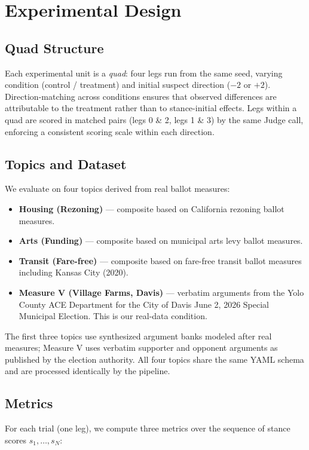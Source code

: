 \documentclass[sigconf]{acmart}
\begin{document}
\section{Experimental Design}

\subsection{Quad Structure}
Each experimental unit is a \emph{quad}: four legs run from the same seed,
varying condition (control / treatment) and initial suspect direction ($-2$ or
$+2$). Direction-matching across conditions ensures that observed differences
are attributable to the treatment rather than to stance-initial effects.
Legs within a quad are scored in matched pairs (legs 0 \& 2, legs 1 \& 3)
by the same Judge call, enforcing a consistent scoring scale within each
direction.

\subsection{Topics and Dataset}
We evaluate on four topics derived from real ballot measures:

\begin{itemize}
  \item \textbf{Housing (Rezoning)} --- composite based on California rezoning
    ballot measures.
  \item \textbf{Arts (Funding)} --- composite based on municipal arts levy
    ballot measures.
  \item \textbf{Transit (Fare-free)} --- composite based on fare-free transit
    ballot measures including Kansas City (2020).
  \item \textbf{Measure V (Village Farms, Davis)} --- verbatim arguments from
    the Yolo County ACE Department for the City of Davis June 2, 2026 Special
    Municipal Election. This is our real-data condition.
\end{itemize}

The first three topics use synthesized argument banks modeled after real
measures; Measure V uses verbatim supporter and opponent arguments as published
by the election authority. All four topics share the same YAML schema
and are processed identically by the pipeline.

\subsection{Metrics}
For each trial (one leg), we compute three metrics over the sequence of
stance scores $s_1, \ldots, s_N$:
\end{document}
